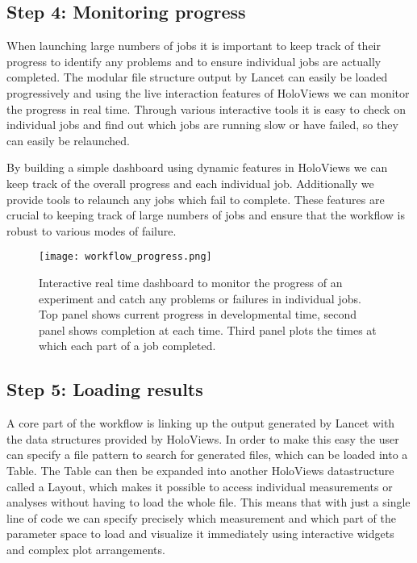 \subsection{Step 4: Monitoring progress}

When launching large numbers of jobs it is important to keep track of
their progress to identify any problems and to ensure individual jobs
are actually completed. The modular file structure output by Lancet
can easily be loaded progressively and using the live interaction
features of HoloViews we can monitor the progress in real
time. Through various interactive tools it is easy to check on
individual jobs and find out which jobs are running slow or have
failed, so they can easily be relaunched.

By building a simple dashboard using dynamic features in HoloViews we
can keep track of the overall progress and each individual job.
Additionally we provide tools to relaunch any jobs which fail to
complete. These features are crucial to keeping track of large numbers
of jobs and ensure that the workflow is robust to various modes of
failure.

\begin{figure}
	\centering
        \texttt{[image: workflow\_progress.png]}
	    \caption[Interactive dashboard to monitor workflow
          progress.]{Interactive real time dashboard to monitor the
          progress of an experiment and catch any problems or failures
          in individual jobs. Top panel shows current progress in
          developmental time, second panel shows completion at each
          time. Third panel plots the times at which each part of a
          job completed.}
	\label{workflow_progress}
\end{figure}


\subsection{Step 5: Loading results}

A core part of the workflow is linking up the output generated by
Lancet with the data structures provided by HoloViews. In order to
make this easy the user can specify a file pattern to search for
generated files, which can be loaded into a Table. The Table can then
be expanded into another HoloViews datastructure called a Layout,
which makes it possible to access individual measurements or analyses
without having to load the whole file. This means that with just a
single line of code we can specify precisely which measurement and
which part of the parameter space to load and visualize it immediately
using interactive widgets and complex plot arrangements.


